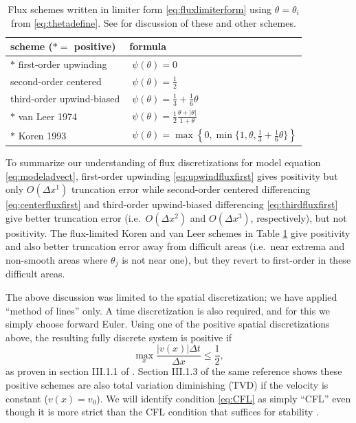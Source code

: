 \documentclass[11pt,final]{amsart}%
\begin{document}
\begin{table}[ht]
  \centering
  \caption{Flux schemes written in limiter form \eqref{eq:fluxlimiterform} using $\theta=\theta_i$ from \eqref{eq:thetadefine}.  See \cite{HundsdorferVerwer2010} for discussion of these and other schemes.}
  \begin{tabular}{ll}
    \textbf{scheme ($\ast=$ positive)} & \textbf{formula} \\
\hline
    $\ast$ first-order upwinding               & $\phantom{\Big|}\psi(\theta) = 0$ \\
    \phantom{$\ast$} second-order centered     & $\phantom{\Big|}\psi(\theta) = \frac{1}{2}$  \\
    \phantom{$\ast$} third-order upwind-biased & $\phantom{\Big|}\psi(\theta) = \frac{1}{3}+\frac{1}{6} \theta$  \\
    $\ast$ van Leer 1974                       & $\phantom{\Big|}\psi(\theta) = \frac{1}{2} \frac{\theta + |\theta|}{1+\theta}$  \\
    $\ast$ Koren 1993                          & $\phantom{\Big|}\psi(\theta) = \max\left\{0,\min\{1,\theta,\frac{1}{3}+\frac{1}{6} \theta\}\right\}$  \\
    \hline
  \end{tabular}
 \label{tab:fluxlimiters}
\end{table}

To summarize our understanding of flux discretizations for model equation \eqref{eq:modeladvect}, first-order upwinding \eqref{eq:upwindfluxfirst} gives positivity but only $O(\Delta x^1)$ truncation error while second-order centered differencing \eqref{eq:centerfluxfirst} and third-order upwind-biased differencing \eqref{eq:thirdfluxfirst} give better truncation error (i.e.~$O(\Delta x^2)$ and $O(\Delta x^3)$, respectively), but not positivity.  The flux-limited Koren and van Leer schemes in Table \ref{tab:fluxlimiters} give positivity and also better truncation error away from difficult areas (i.e.~near extrema and non-smooth areas where $\theta_j$ is not near one), but they revert to first-order in these difficult areas.

The above discussion was limited to the spatial discretization; we have applied ``method of lines'' only.  A time discretization is also required, and for this we simply choose forward Euler.  Using one of the positive spatial discretizations above, the resulting fully discrete system is positive if
\begin{equation}
\max_x \frac{|v(x)|\Delta t}{\Delta x} \le \frac{1}{2}, \label{eq:CFL}
\end{equation}
as proven in section III.1.1 of \cite{HundsdorferVerwer2010}.  Section III.1.3 of the same reference shows these positive schemes are also total variation diminishing (TVD) if the velocity is constant ($v(x)=v_0$).  We will identify condition \eqref{eq:CFL} as simply ``CFL'' even though it is more strict than the CFL condition that suffices for stability \citep{MortonMayers}.
\end{document}
